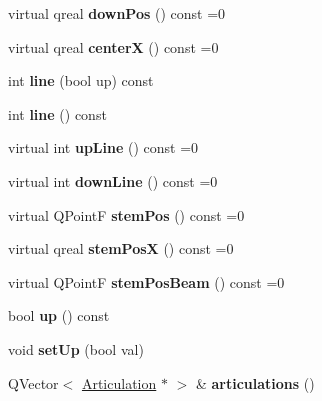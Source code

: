 \begin{DoxyCompactItemize}
virtual qreal {\bfseries down\+Pos} () const =0
\item 
\mbox{\label{class_ms_1_1_chord_rest_a86d13e1709b4f93563ec09d49184a2ce}} 
virtual qreal {\bfseries centerX} () const =0
\item 
\mbox{\label{class_ms_1_1_chord_rest_a73bf68dd25f2c3fefc6a9451c2387e07}} 
int {\bfseries line} (bool up) const
\item 
\mbox{\label{class_ms_1_1_chord_rest_af8d6f832ec77d99584221063031d36ba}} 
int {\bfseries line} () const
\item 
\mbox{\label{class_ms_1_1_chord_rest_ad19c4c59276f6aac1889585592cc0149}} 
virtual int {\bfseries up\+Line} () const =0
\item 
\mbox{\label{class_ms_1_1_chord_rest_a221603e8d1bd4b3517dd7d8b408ed011}} 
virtual int {\bfseries down\+Line} () const =0
\item 
\mbox{\label{class_ms_1_1_chord_rest_a86b66562a8b7225c6c8a7243a2ae8ef9}} 
virtual Q\+PointF {\bfseries stem\+Pos} () const =0
\item 
\mbox{\label{class_ms_1_1_chord_rest_a6af4973e0eae32449f75804e2f257035}} 
virtual qreal {\bfseries stem\+PosX} () const =0
\item 
\mbox{\label{class_ms_1_1_chord_rest_ad6204985ab89a3f9b25e264baf96a0b0}} 
virtual Q\+PointF {\bfseries stem\+Pos\+Beam} () const =0
\item 
\mbox{\label{class_ms_1_1_chord_rest_ae9e872e395ceb99e383a6ef53ceb9848}} 
bool {\bfseries up} () const
\item 
\mbox{\label{class_ms_1_1_chord_rest_a2b72483f57a0227ee6708fe1d2a3606e}} 
void {\bfseries set\+Up} (bool val)
\item 
\mbox{\label{class_ms_1_1_chord_rest_a17acdd2856c1613ab763c8d402f1eeeb}} 
Q\+Vector$<$ \hyperlink{class_ms_1_1_articulation}{Articulation} $\ast$ $>$ \& {\bfseries articulations} ()

\end{DoxyCompactItemize}
